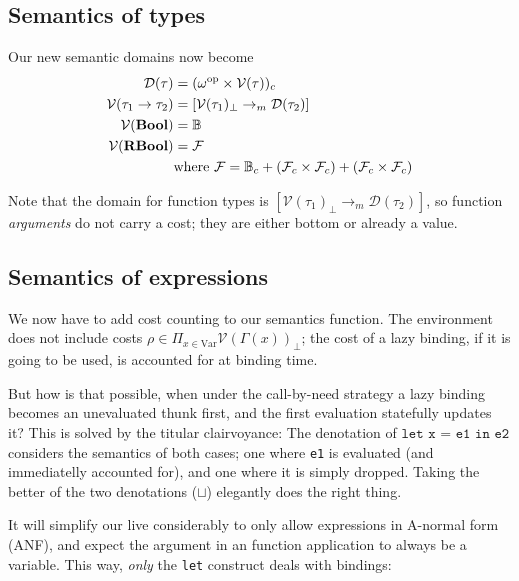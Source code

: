 \documentclass[manuscript,screen,acmsmall,nonacm]{acmart}
\newcommand{\syntax}[1]{\mathbf{#1}}
\newcommand{\Var}{\text{Var}}
\newcommand{\tBool}{\syntax{Bool}}
\newcommand{\tRBool}{\syntax{RBool}}
\newcommand{\dBool}{\mathbb B}
\newcommand{\dRBool}{\mathcal F}
\newcommand{\tV}[1]{\mathcal V(#1)}
\newcommand{\tD}[1]{\mathcal D(#1)}
\begin{document}
\subsection{Semantics of types}

Our new semantic domains now become
\begin{align*}
\tD\tau &= (\omegaop\times\tV\tau)_c\\
\tV{\tau_1 \to \tau_2} &= [\tV{\tau_1}_\bot \to_m \tD{\tau_2}] \\
\tV{\tBool} &= \dBool \\
\tV{\tRBool} &= \dRBool \\
&\text{where } \dRBool = \dBool_c + (\dRBool_c \times \dRBool_c) + (\dRBool_c \times \dRBool_c)
\end{align*}

Note that the domain for function types is $[\tV{\tau_1}_\bot \to_m \tD{\tau_2}]$, so function \emph{arguments} do not carry a cost; they are either bottom or already a value.

\subsection{Semantics of expressions}

We now have to add cost counting to our semantics function. The environment does not include costs
$\rho \in \Pi_{x \in \Var} \tV{\Gamma(x)}_\bot$; the cost of a lazy binding, if it is going to be used, is accounted for at binding time.

But how is that possible, when under the call-by-need  strategy a lazy binding becomes an unevaluated thunk first, and the first evaluation statefully updates it? This is solved by the titular clairvoyance: The denotation of $\texttt{let x = e1 in e2}$ considers the semantics of both cases; one where \texttt{e1} is evaluated (and immediatelly accounted for), and one where it is simply dropped. Taking the better of the two denotations ($\sqcup$) elegantly does the right thing.

It will simplify our live considerably to only allow expressions in A-normal form (ANF), and expect the argument in an function application to always be a variable. This way, \emph{only} the \texttt{let} construct deals with bindings:
\end{document}
